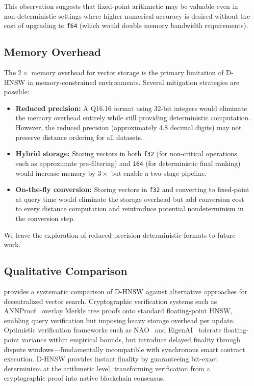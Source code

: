 \documentclass[10pt,journal]{IEEEtran}
\newcommand{\dhnsw}{\textsc{D-HNSW}}
\newcommand{\hnsw}{\textsc{HNSW}}
\begin{document}
This observation suggests that fixed-point arithmetic may be valuable even in non-deterministic settings where higher numerical accuracy is desired without the cost of upgrading to \texttt{f64} (which would double memory bandwidth requirements).

\subsection{Memory Overhead}

The $2\times$ memory overhead for vector storage is the primary limitation of \dhnsw{} in memory-constrained environments. Several mitigation strategies are possible:

\begin{itemize}[leftmargin=*]
  \item \textbf{Reduced precision:} A Q16.16 format using 32-bit integers would eliminate the memory overhead entirely while still providing deterministic computation. However, the reduced precision (approximately $4.8$ decimal digits) may not preserve distance ordering for all datasets.

  \item \textbf{Hybrid storage:} Storing vectors in both \texttt{f32} (for non-critical operations such as approximate pre-filtering) and \texttt{i64} (for deterministic final ranking) would increase memory by $3\times$ but enable a two-stage pipeline.

  \item \textbf{On-the-fly conversion:} Storing vectors in \texttt{f32} and converting to fixed-point at query time would eliminate the storage overhead but add conversion cost to every distance computation and reintroduce potential nondeterminism in the conversion step.
\end{itemize}

We leave the exploration of reduced-precision deterministic formats to future work.

\subsection{Qualitative Comparison}

 provides a systematic comparison of \dhnsw{} against alternative approaches for decentralized vector search. Cryptographic verification systems such as ANNProof~\cite{lu2024annproof} overlay Merkle tree proofs onto standard floating-point \hnsw{}, enabling query verification but imposing heavy storage overhead per update. Optimistic verification frameworks such as NAO~\cite{yao2025nao} and EigenAI~\cite{alves2026eigenai} tolerate floating-point variance within empirical bounds, but introduce delayed finality through dispute windows---fundamentally incompatible with synchronous smart contract execution. \dhnsw{} provides instant finality by guaranteeing bit-exact determinism at the arithmetic level, transforming verification from a cryptographic proof into native blockchain consensus.
\end{document}
